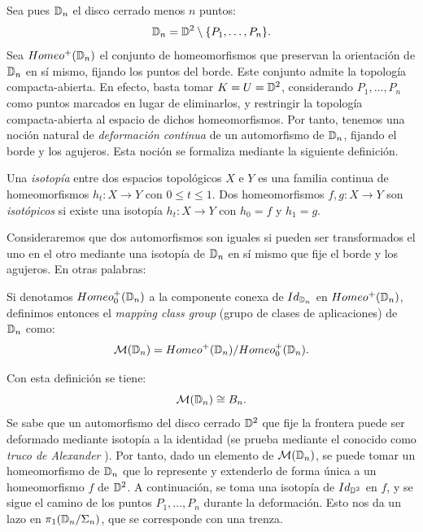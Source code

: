\documentclass[TFG.tex]{subfiles}
\begin{document}
Sea pues $\mathbb{D}_n$ el disco cerrado menos $n$ puntos:
$$\mathbb{D}_n=\mathbb{D}^2\setminus\{P_1,\dots, P_n\}.$$
Sea $Homeo^+(\mathbb{D}_n)$ el conjunto de homeomorfismos que preservan la orientación de $\mathbb{D}_n$ en sí mismo, fijando los puntos del borde. Este conjunto admite la topología compacta-abierta. En efecto, basta tomar $K=U=\mathbb{D}^2$, considerando $P_1,\dots, P_n$ como puntos marcados en lugar de eliminarlos, y restringir la topología compacta-abierta al espacio de dichos homeomorfismos. Por tanto, tenemos una noción natural de \emph{deformación continua} de un automorfismo de $\mathbb{D}_n$, fijando el borde y los agujeros. Esta noción se formaliza mediante la siguiente definición.

\begin{defi}
Una \emph{isotopía} entre dos espacios topológicos $X$ e $Y$ es una familia continua de homeomorfismos $h_t:X\to Y$ con $0\leq t\leq 1$. Dos homeomorfismos $f,g:X\to Y$ son \emph{isotópicos} si existe una isotopía $h_t:X\to Y$ con $h_0=f$ y $h_1=g$. 
\end{defi}

Consideraremos que dos automorfismos son iguales si pueden ser transformados el uno en el otro mediante una isotopía de $\mathbb{D}_n$ en sí mismo que fije el borde y los agujeros. En otras palabras:

\begin{defi} Si denotamos $Homeo^+_0(\mathbb{D}_n)$ a la componente conexa de $Id_{\mathbb{D}_n}$ en $Homeo^+(\mathbb{D}_n)$, definimos entonces el \emph{mapping class group} (grupo de clases de aplicaciones) de $\mathbb{D}_n$ como:
$$\mathcal{M}(\mathbb{D}_n)=Homeo^+(\mathbb{D}_n)/Homeo^+_0(\mathbb{D}_n).$$
\end{defi}

Con esta definición se tiene:
$$\mathcal{M}(\mathbb{D}_n)\cong B_n.$$
Se sabe que un automorfismo del disco cerrado $\mathbb{D}^2$ que fije la frontera puede ser deformado mediante isotopía a la identidad (se prueba mediante el conocido como \emph{truco de Alexander} \cite{Alexander}). Por tanto, dado un elemento de $\mathcal{M}(\mathbb{D}_n)$, se puede tomar un homeomorfismo de $\mathbb{D}_n$ que lo represente y extenderlo de forma única a un homeomorfismo $f$ de $\mathbb{D}^2$. A continuación, se toma una isotopía de $Id_{\mathbb{D}^2}$ en $f$, y se sigue el camino de los puntos $P_1,\dots, P_n$ durante la deformación. Esto nos da un lazo en $\pi_1(\mathbb{D}_n/\Sigma_n)$, que se corresponde con una trenza. 


\end{document}
